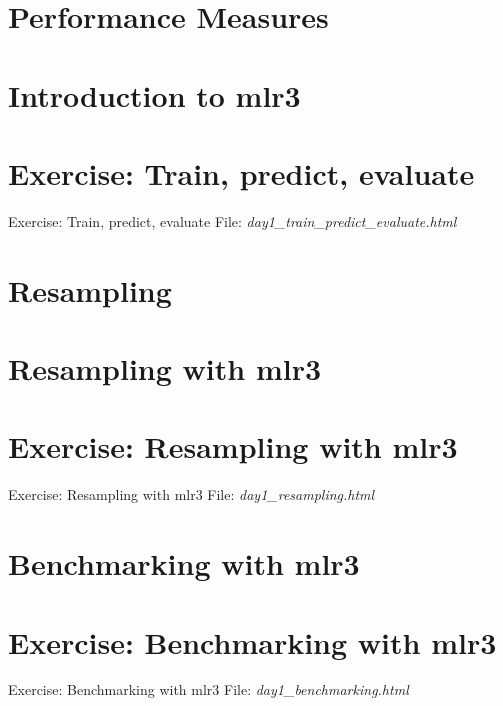 \documentclass[13pt,compress]{beamer}
\begin{document}
\section{Performance Measures}





\section{Introduction to mlr3}

\section{Exercise: Train, predict, evaluate}
\begin{frame}{Exercise: Train, predict, evaluate}
File: \textit{day1\_train\_predict\_evaluate.html}
\end{frame}
\section{Resampling}



\section{Resampling with mlr3}

\section{Exercise: Resampling with mlr3}
\begin{frame}{Exercise: Resampling with mlr3}
File: \textit{day1\_resampling.html}
\end{frame}
\section{Benchmarking with mlr3}

\section{Exercise: Benchmarking with mlr3}
\begin{frame}{Exercise: Benchmarking with mlr3}
File: \textit{day1\_benchmarking.html}
\end{frame}
\end{document}
